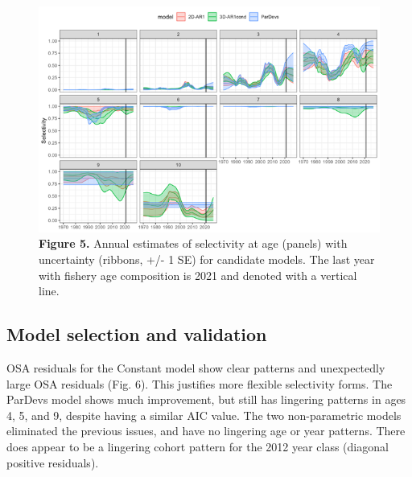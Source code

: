 \documentclass[
]{article}
\begin{document}
{{{\begin{figure}
\hypertarget{fig:figure5}{%
\centering
\includegraphics{Results/Figure5_selectivity_at_age_timeseries.png}
\caption{\textbf{Figure 5.} Annual estimates of selectivity at age
(panels) with uncertainty (ribbons, +/- 1 SE) for candidate models. The
last year with fishery age composition is 2021 and denoted with a
vertical line.}\label{fig:figure5}
}
\end{figure}

\hypertarget{model-selection-and-validation}{%
\subsection{Model selection and
validation}\label{model-selection-and-validation}}

OSA residuals for the Constant model show clear patterns and
unexpectedly large OSA residuals (Fig. 6). This justifies more flexible
selectivity forms. The ParDevs model shows much improvement, but still
has lingering patterns in ages 4, 5, and 9, despite having a similar AIC
value. The two non-parametric models eliminated the previous issues, and
have no lingering age or year patterns. There does appear to be a
lingering cohort pattern for the 2012 year class (diagonal positive
residuals).

}}}
\end{document}
